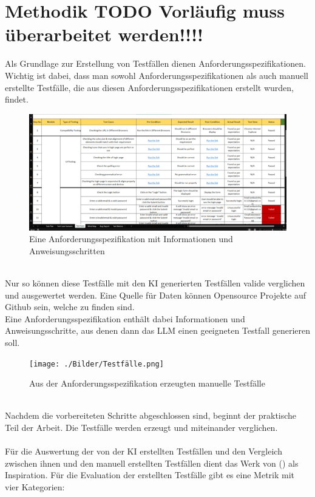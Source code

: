\documentclass[12pt,toc=bib,toc=listof]{scrreprt}
\begin{document}
\chapter{Methodik TODO Vorläufig muss überarbeitet werden!!!!} %
\label{sec:methodik}
Als Grundlage zur Erstellung von Testfällen dienen Anforderungsspezifikationen. Wichtig ist dabei, dass man sowohl Anforderungsspezifikationen als auch manuell erstellte Testfälle, die aus diesen Anforderungsspezifikationen erstellt wurden, findet.\\
\begin{figure} [h!]
    \centering
    \includegraphics[width=1\linewidth]{./Bilder/Testspezifikationen.png}
    \caption{Eine Anforderungsspezifikation mit Informationen und Anweisungsschritten}
\end{figure}
\\
Nur so können diese Testfälle mit den KI generierten Testfällen valide verglichen und ausgewertet werden. Eine Quelle für Daten können Opensource Projekte auf Github sein, welche zu finden sind.\\
\newpage
\noindent Eine Anforderungsspezifikation enthält dabei Informationen und Anweisungsschritte, aus denen dann das LLM einen geeigneten Testfall generieren soll.\\
\begin{figure} [h!]
    \centering
    \texttt{[image: ./Bilder/Testfälle.png]}
    \caption{Aus der Anforderungsspezifikation erzeugten manuelle Testfälle}
\end{figure}
\\
Nachdem die vorbereiteten Schritte abgeschlossen sind, beginnt der praktische Teil der Arbeit. Die Testfälle werden erzeugt und miteinander verglichen.\\
\\
Für die Auswertung der von der KI erstellten Testfällen und den Vergleich zwischen ihnen und den manuell erstellten Testfällen dient das Werk von (\cite{Wang2024}) als Inspiration. Für die Evaluation der erstellten Testfälle gibt es eine Metrik mit vier Kategorien:\\
\end{document}
